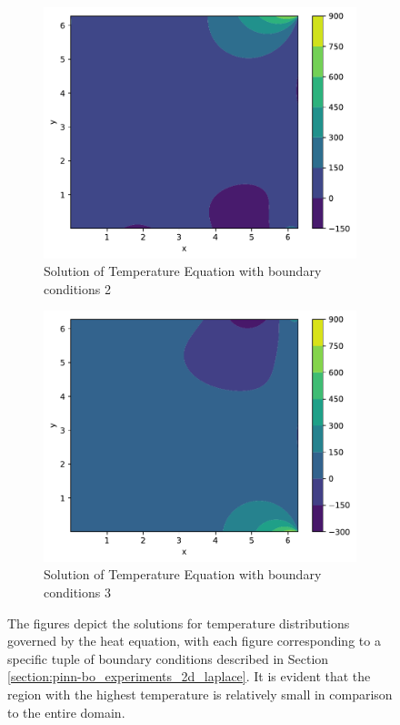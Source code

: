 \begin{figure}[H]
\begin{subfigure}[b]{0.49\textwidth}
        \includegraphics[width=1\textwidth]{Figures/PINN-BO/heat_py_pde_1000_test_2.pdf}
        \caption{Solution of Temperature Equation with boundary conditions 2}
        \label{fig:heat_2_dist}
    \end{subfigure}
    \hfill
    \begin{subfigure}[b]{0.5\textwidth}
        \centering
        \includegraphics[width=\textwidth]{Figures/PINN-BO/heat_py_pde_1000_test_3.pdf}
        \caption{Solution of Temperature Equation with boundary conditions 3}
        \label{fig:heat_3_dist}
    \end{subfigure}
    \caption{The figures depict the solutions for temperature distributions governed by the heat equation, with each figure corresponding to a specific tuple of boundary conditions described in Section \ref{section:pinn-bo_experiments_2d_laplace}. It is evident that the region with the highest temperature is relatively small in comparison to the entire domain.}
    \label{fig:heat_dist}
\end{figure}

